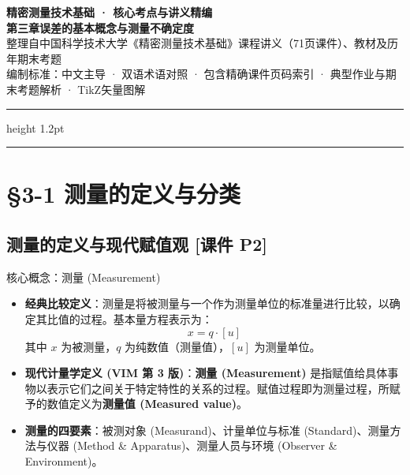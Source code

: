\documentclass[11pt,a4paper]{ctexart}
\begin{document}
\begin{center}
    {\LARGE\bfseries\sffamily\color{primaryblue} 精密测量技术基础 · 核心考点与讲义精编}\\[0.6em]
    {\Large\bfseries 第三章\quad 误差的基本概念与测量不确定度}\\[0.8em]
    {\small\kaishu 整理自中国科学技术大学《精密测量技术基础》课程讲义（71页课件）、教材及历年期末考题}\\[0.4em]
    {\footnotesize 编制标准：中文主导 · 双语术语对照 · 包含精确课件页码索引 · 典型作业与期末考题解析 · TikZ矢量图解}
\end{center}

\vspace{-0.5em}
\hrule height 1.2pt
\vspace{0.8em}

\tableofcontents
\vspace{1em}
\hrule
\vspace{1.5em}

\section{§3-1 测量的定义与分类}

\subsection{测量的定义与现代赋值观 \textnormal{[课件 P2]}}

\begin{defbox}{核心概念：测量 (Measurement)}
\begin{itemize}
    \item \textbf{经典比较定义}：测量是将被测量与一个作为测量单位的标准量进行比较，以确定其比值的过程。基本量方程表示为：
    \begin{equation}
        x = q \cdot [u]
    \end{equation}
    其中 $x$ 为被测量，$q$ 为纯数值（测量值），$[u]$ 为测量单位。
    \item \textbf{现代计量学定义 (VIM 第 3 版)}：\textbf{测量 (Measurement)} 是指赋值给具体事物以表示它们之间关于特定特性的关系的过程。赋值过程即为测量过程，所赋予的数值定义为\textbf{测量值 (Measured value)}。
    \item \textbf{测量的四要素}：被测对象 (Measurand)、计量单位与标准 (Standard)、测量方法与仪器 (Method \& Apparatus)、测量人员与环境 (Observer \& Environment)。
\end{itemize}
\end{defbox}
\end{document}
